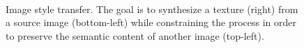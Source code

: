 \begin{figure}[t]
\begin{center}
	\\
	\caption[Image style transfer.]{Image style transfer. The goal is to synthesize a texture (right) from a source image (bottom-left) while constraining the process in order to preserve the semantic content of another image (top-left).}
	\vspace{-0.65cm}
	\label{fig:style_transfer}
\end{center}
\end{figure}